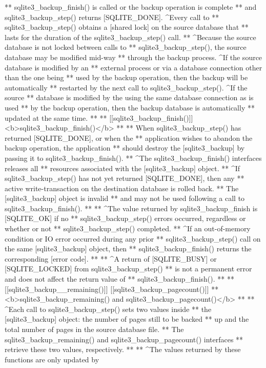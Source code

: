 \begin{Codex}[label=sqlite3.h,numbers=left]
{** sqlite3_backup_finish() is called or the backup operation is complete 
** and sqlite3_backup_step() returns [SQLITE_DONE].  ^Every call to
** sqlite3_backup_step() obtains a [shared lock] on the source database that
** lasts for the duration of the sqlite3_backup_step() call.
** ^Because the source database is not locked between calls to
** sqlite3_backup_step(), the source database may be modified mid-way
** through the backup process.  ^If the source database is modified by an
** external process or via a database connection other than the one being
** used by the backup operation, then the backup will be automatically
** restarted by the next call to sqlite3_backup_step(). ^If the source 
** database is modified by the using the same database connection as is used
** by the backup operation, then the backup database is automatically
** updated at the same time.
**
** [[sqlite3_backup_finish()]] <b>sqlite3_backup_finish()</b>
**
** When sqlite3_backup_step() has returned [SQLITE_DONE], or when the 
** application wishes to abandon the backup operation, the application
** should destroy the [sqlite3_backup] by passing it to sqlite3_backup_finish().
** ^The sqlite3_backup_finish() interfaces releases all
** resources associated with the [sqlite3_backup] object. 
** ^If sqlite3_backup_step() has not yet returned [SQLITE_DONE], then any
** active write-transaction on the destination database is rolled back.
** The [sqlite3_backup] object is invalid
** and may not be used following a call to sqlite3_backup_finish().
**
** ^The value returned by sqlite3_backup_finish is [SQLITE_OK] if no
** sqlite3_backup_step() errors occurred, regardless or whether or not
** sqlite3_backup_step() completed.
** ^If an out-of-memory condition or IO error occurred during any prior
** sqlite3_backup_step() call on the same [sqlite3_backup] object, then
** sqlite3_backup_finish() returns the corresponding [error code].
**
** ^A return of [SQLITE_BUSY] or [SQLITE_LOCKED] from sqlite3_backup_step()
** is not a permanent error and does not affect the return value of
** sqlite3_backup_finish().
**
** [[sqlite3_backup__remaining()]] [[sqlite3_backup_pagecount()]]
** <b>sqlite3_backup_remaining() and sqlite3_backup_pagecount()</b>
**
** ^Each call to sqlite3_backup_step() sets two values inside
** the [sqlite3_backup] object: the number of pages still to be backed
** up and the total number of pages in the source database file.
** The sqlite3_backup_remaining() and sqlite3_backup_pagecount() interfaces
** retrieve these two values, respectively.
**
** ^The values returned by these functions are only updated by
}
\end{Codex}
